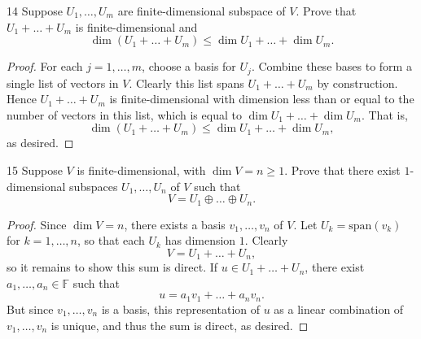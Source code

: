 \documentclass[11pt]{extarticle}
\newenvironment{problem}[1]{\begin{prob*}{#1}{}}{\end{prob*}}
\newcommand{\F}{\mathbb{F}}
\newcommand{\Span}{\mathrm{span}}
\begin{document}
\begin{problem}{14}
Suppose $U_1,\dots,U_m$ are finite-dimensional subspace of $V$.  Prove that $U_1 + \dots + U_m$ is finite-dimensional and 
\begin{equation*}
\dim\left(U_1  + \dots + U_m\right)\leq \dim U_1 + \dots + \dim U_m.
\end{equation*}
\end{problem}
\begin{proof}
For each $j = 1,\dots,m$, choose a basis for $U_j$.  Combine these bases to form a single list of vectors in $V$.  Clearly this list spans $U_1 + \dots + U_m$ by construction.  Hence $U_1 + \dots + U_m$ is finite-dimensional with dimension less than or equal to the number of vectors in this list, which is equal to $\dim U_1 + \dots + \dim U_m$.  That is,
\begin{equation*}
\dim\left(U_1 + \dots + U_m\right)\leq \dim U_1 + \dots + \dim U_m,
\end{equation*} 
as desired.
\end{proof}

\begin{problem}{15}
Suppose $V$ is finite-dimensional, with $\dim V= n\geq 1$.  Prove that there exist $1$-dimensional subspaces $U_1,\dots, U_n$ of $V$ such that 
\begin{equation*}
V = U_1\oplus \dots \oplus U_n.
\end{equation*}
\end{problem}
\begin{proof}
Since $\dim V = n$, there exists a basis $v_1,\dots, v_n$ of $V$.  Let $U_k = \Span(v_k)$ for $k = 1,\dots, n$, so that each $U_k$ has dimension $1$.  Clearly 
\begin{equation*}
V = U_1 + \dots + U_n,
\end{equation*}
so it remains to show this sum is direct.  If $u \in U_1 + \dots + U_n$, there exist $a_1,\dots, a_n\in\F$ such that
\begin{equation*}
u = a_1v_1 + \dots + a_nv_n.
\end{equation*}
But since $v_1,\dots, v_n$ is a basis, this representation of $u$ as a linear combination of $v_1,\dots,v_n$ is unique, and thus the sum is direct, as desired.
\end{proof}
\end{document}
